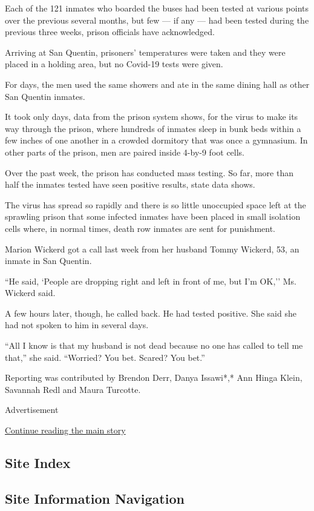 Each of the 121 inmates who boarded the buses had been tested at various
points over the previous several months, but few --- if any --- had been
tested during the previous three weeks, prison officials have
acknowledged.

Arriving at San Quentin, prisoners' temperatures were taken and they
were placed in a holding area, but no Covid-19 tests were given.

For days, the men used the same showers and ate in the same dining hall
as other San Quentin inmates.

It took only days, data from the prison system shows, for the virus to
make its way through the prison, where hundreds of inmates sleep in bunk
beds within a few inches of one another in a crowded dormitory that was
once a gymnasium. In other parts of the prison, men are paired inside
4-by-9 foot cells.

Over the past week, the prison has conducted mass testing. So far, more
than half the inmates tested have seen positive results, state data
shows.

The virus has spread so rapidly and there is so little unoccupied space
left at the sprawling prison that some infected inmates have been placed
in small isolation cells where, in normal times, death row inmates are
sent for punishment.

Marion Wickerd got a call last week from her husband Tommy Wickerd, 53,
an inmate in San Quentin.

``He said, `People are dropping right and left in front of me, but I'm
OK,'' Ms. Wickerd said.

A few hours later, though, he called back. He had tested positive. She
said she had not spoken to him in several days.

``All I know is that my husband is not dead because no one has called to
tell me that,'' she said. ``Worried? You bet. Scared? You bet.''

Reporting was contributed by Brendon Derr, Danya Issawi*,* Ann Hinga
Klein, Savannah Redl and Maura Turcotte.

Advertisement

\protect\hyperlink{after-bottom}{Continue reading the main story}

\hypertarget{site-index}{%
\subsection{Site Index}\label{site-index}}

\hypertarget{site-information-navigation}{%
\subsection{Site Information
Navigation}\label{site-information-navigation}}

